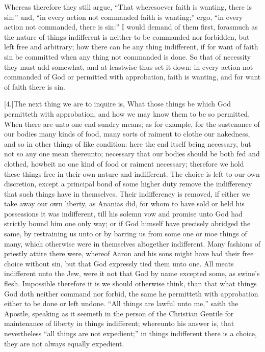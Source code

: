 Whereas therefore they still argue, “That wheresoever faith is wanting, there is sin;” and, “in every action not  commanded faith is wanting;” ergo, “in every action not commanded, there is sin:” I would demand of them first, forasmuch as the nature of things indifferent is neither to be commanded nor forbidden, but left free and arbitrary; how there can be any thing indifferent, if for want of faith sin be committed when any thing not commanded is done. So that of necessity they must add somewhat, and at leastwise thus set it down: in every action not commanded of God or permitted with approbation, faith is wanting, and for want of faith there is sin.

[4.]The next thing we are to inquire is, What those things be which God permitteth with approbation, and how we may know them to be so permitted. When there are unto one end sundry means; as for example, for the sustenance of our bodies many kinds of food, many sorts of raiment to clothe our nakedness, and so in other things of like condition: here the end itself being necessary, but not so any one mean thereunto; necessary that our bodies should be both fed and clothed, howbeit no one kind of food or raiment necessary; therefore we hold these things free in their own nature and indifferent. The choice is left to our own discretion, except a principal bond of some higher duty remove the indifferency that such things have in themselves. Their indifferency is removed, if either we take away our own liberty, as Ananias did, for whom to have sold or held his possessions it was indifferent, till his solemn vow and promise unto God had strictly bound him one only way; or if God himself have precisely abridged the same, by restraining us unto or by barring us from some one or moe things of many, which otherwise were in themselves altogether indifferent. Many fashions of priestly attire there were, whereof Aaron and his sons might have had their free choice without sin, but that God expressly tied them unto one. All meats indifferent unto the Jew, were it not that God by name excepted some, as swine’s flesh. Impossible therefore it is we should otherwise think, than that what things God doth neither command nor forbid, the same he permitteth with approbation either to be done or left undone.  “All things are lawful unto me,” saith the Apostle, speaking as it seemeth in the person of the Christian Gentile for maintenance of liberty in things indifferent; whereunto his answer is, that nevertheless “all things are not expedient;” in things indifferent there is a choice, they are not always equally expedient.

